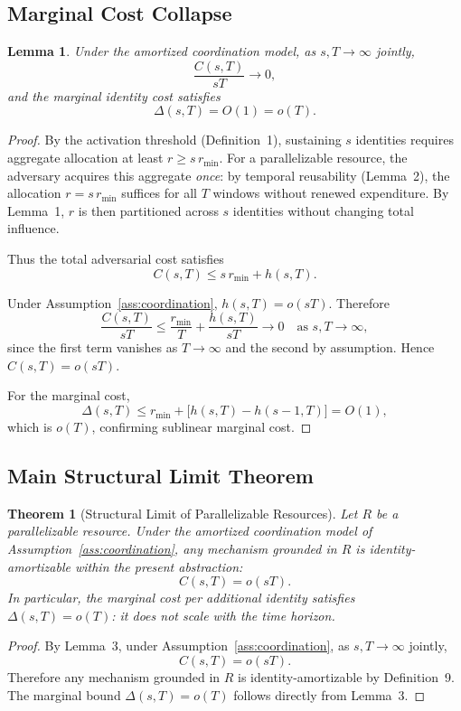 \documentclass[journal]{IEEEtran}
\newtheorem{theorem}{Theorem}
\newtheorem{lemma}{Lemma}
\begin{document}
	
	\subsection{Marginal Cost Collapse}
	\begin{lemma}
		Under the amortized coordination model,
		as $s, T \to \infty$ jointly,
		\[
		\frac{C(s,T)}{sT} \to 0,
		\]
		and the marginal identity cost satisfies
		\[
		\Delta(s,T) = O(1) = o(T).
		\]
	\end{lemma}
	\begin{proof}
		By the activation threshold (Definition~1),
		sustaining $s$ identities requires aggregate
		allocation at least $r \ge s\,r_{\min}$.
		For a parallelizable resource, the adversary
		acquires this aggregate \emph{once}: by temporal
		reusability (Lemma~2), the allocation
		$r = s\,r_{\min}$ suffices for all $T$ windows
		without renewed expenditure.
		By Lemma~1, $r$ is then partitioned across
		$s$ identities without changing total influence.
		
		Thus the total adversarial cost satisfies
		\[
		C(s,T) \le s\,r_{\min} + h(s,T).
		\]
		
		Under Assumption~\ref{ass:coordination},
		$h(s,T) = o(sT)$. Therefore
		\[
		\frac{C(s,T)}{sT}
		\le
		\frac{r_{\min}}{T}
		+
		\frac{h(s,T)}{sT}
		\to 0
		\quad \text{as } s,T \to \infty,
		\]
		since the first term vanishes as $T \to \infty$
		and the second by assumption.
		Hence $C(s,T) = o(sT)$.
		
		For the marginal cost,
		\[
		\Delta(s,T)
		\le
		r_{\min} + \bigl[h(s,T) - h(s-1,T)\bigr]
		= O(1),
		\]
		which is $o(T)$, confirming sublinear marginal cost.
	\end{proof}
	
	
	
	\subsection{Main Structural Limit Theorem}
	\begin{theorem}[Structural Limit of Parallelizable Resources]
		
		Let $R$ be a parallelizable resource.
		Under the amortized coordination model of
		Assumption~\ref{ass:coordination},
		any mechanism grounded in $R$
		is identity-amortizable within the present abstraction:
		\[
		C(s,T) = o(sT).
		\]
		In particular, the marginal cost per additional
		identity satisfies $\Delta(s,T) = o(T)$:
		it does not scale with the time horizon.
		
	\end{theorem}
	\begin{proof}
		By Lemma~3, under Assumption~\ref{ass:coordination},
		as $s, T \to \infty$ jointly,
		\[
		C(s,T) = o(sT).
		\]
		Therefore any mechanism grounded in $R$ is
		identity-amortizable by Definition~9.
		The marginal bound $\Delta(s,T) = o(T)$
		follows directly from Lemma~3.
	\end{proof}
	
\end{document}
